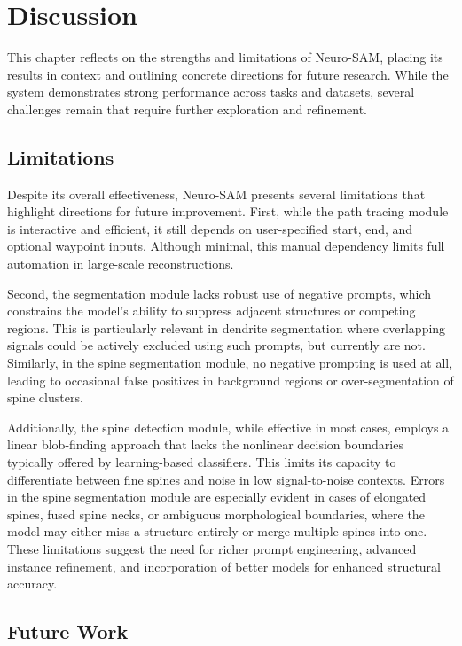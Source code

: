 \chapter{Discussion}

This chapter reflects on the strengths and limitations of Neuro-\gls{SAM}, placing its results in context and outlining concrete directions for future research. While the system demonstrates strong performance across tasks and datasets, several challenges remain that require further exploration and refinement.

\section{Limitations}

Despite its overall effectiveness, Neuro-\gls{SAM} presents several limitations that highlight directions for future improvement. First, while the path tracing module is interactive and efficient, it still depends on user-specified start, end, and optional waypoint inputs. Although minimal, this manual dependency limits full automation in large-scale reconstructions.

Second, the segmentation module lacks robust use of negative prompts, which constrains the model’s ability to suppress adjacent structures or competing regions. This is particularly relevant in dendrite segmentation where overlapping signals could be actively excluded using such prompts, but currently are not. Similarly, in the spine segmentation module, no negative prompting is used at all, leading to occasional false positives in background regions or over-segmentation of spine clusters.

Additionally, the spine detection module, while effective in most cases, employs a linear blob-finding approach that lacks the nonlinear decision boundaries typically offered by learning-based classifiers. This limits its capacity to differentiate between fine spines and noise in low signal-to-noise contexts. Errors in the spine segmentation module are especially evident in cases of elongated spines, fused spine necks, or ambiguous morphological boundaries, where the model may either miss a structure entirely or merge multiple spines into one. These limitations suggest the need for richer prompt engineering, advanced instance refinement, and incorporation of better models for enhanced structural accuracy.


\section{Future Work}

